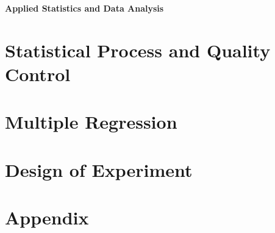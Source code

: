 \documentclass[10pt]{article}
\begin{document}
\footnotesize

\begin{center}
\Large{\textbf{Applied Statistics and Data Analysis}} \\
\end{center}
\begin{multicols}{2}
\setlength{\premulticols}{1pt}
\setlength{\postmulticols}{1pt}
\setlength{\multicolsep}{1pt}
\setlength{\columnsep}{2pt}


\part{Statistical Process and Quality Control}






\part{Multiple Regression}






\part{Design of Experiment}





\part*{Appendix}


\end{multicols}
\end{document}
